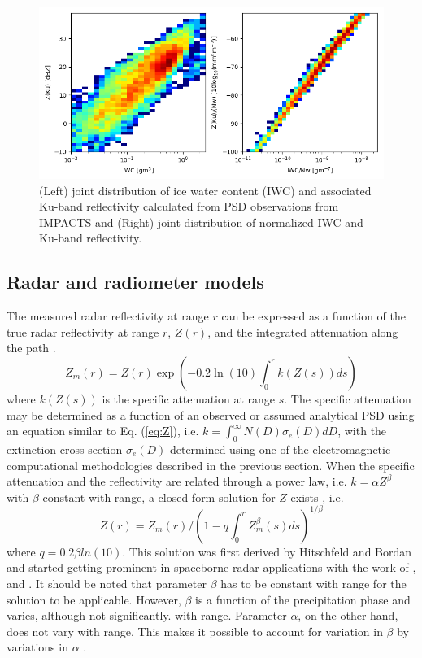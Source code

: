 \documentclass[10pt]{ietbook}
\begin{document}
\begin{figure} 
\centerline{ }
\includegraphics[width=\textwidth]{normZvsnormIWC.png}

\caption{ (Left) joint distribution of ice water content (IWC) and associated Ku-band reflectivity calculated from PSD observations from IMPACTS and
(Right) joint distribution of normalized IWC and Ku-band reflectivity. }
\label{fig:normZ}
\end{figure}

\subsection{Radar and radiometer models}
The measured radar reflectivity at range $r$ can be expressed as a function of the true radar reflectivity at range $r$, $Z(r)$, and the integrated attenuation
along the path \cite{iguchi_meneghini_1994}.
\begin{equation}\label{eq:radarEq}
Z_m(r)=Z(r) \exp(-0.2\ln(10)\int_0^r k(Z(s))ds)
\end{equation}
where $k(Z(s))$ is the specific attenuation at range $s$.  The specific attenuation may be determined as a function of an observed or assumed analytical PSD
using an equation similar to Eq. (\ref{eq:Z}), i.e. $k=\int_0^{\infty} N(D) \sigma_e(D)dD$, with the extinction cross-section $\sigma_e(D)$ determined using one of
the electromagnetic computational methodologies described in the previous section.  When the specific attenuation and the reflectivity are related through a 
power law, i.e. $k=\alpha Z^\beta$ with $\beta$ constant with range, a closed form solution for $Z$ exists \cite{iguchi_meneghini_1994}, i.e.
\begin{equation}\label{eq:hbsol}
Z(r)=Z_m(r) /(1-q\int_0^r Z_m^\beta(s)ds)^{1/\beta}
\end{equation}
where $q=0.2\beta ln(10)$.  This solution was first derived by Hitschfeld and Bordan \cite{hitschfeld1954} and started
getting prominent in spaceborne radar applications with the work of \cite{meneghini1983}, \cite{marzoug1991} 
and \cite{iguchi_meneghini_1994}. It should be noted that parameter $\beta$ has to be constant with range for the solution to be applicable.
However, $\beta$ is a function of the precipitation phase and varies, although not significantly. with range. 
Parameter $\alpha$, on the other hand, does not vary with range. This makes it possible to account for variation in $\beta$ by
variations in $\alpha$ \cite{iguchi_meneghini_1994}.
\end{document}
